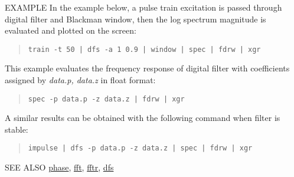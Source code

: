 \begin{qsection}{EXAMPLE}
In the example below, a pulse train excitation is passed
through digital filter and Blackman window,
then the log spectrum magnitude is evaluated and plotted
on the screen:
\begin{quote}
  \verb!train -t 50 | dfs -a 1 0.9 | window | spec | fdrw | xgr !
\end{quote}
\par
This example evaluates the frequency response of
digital filter with coefficients assigned by {\em data.p, data.z}
in float format:
\begin{quote}
  \verb!spec -p data.p -z data.z | fdrw | xgr !
\end{quote}
A similar results can be obtained with the following command
when filter is stable:
\begin{quote}
  \verb!impulse | dfs -p data.p -z data.z | spec | fdrw | xgr !
\end{quote}
\end{qsection}

\begin{qsection}{SEE ALSO}
\hyperlink{phase}{phase},
\hyperlink{fft}{fft},
\hyperlink{fftr}{fftr},
\hyperlink{dfs}{dfs}
\end{qsection}

